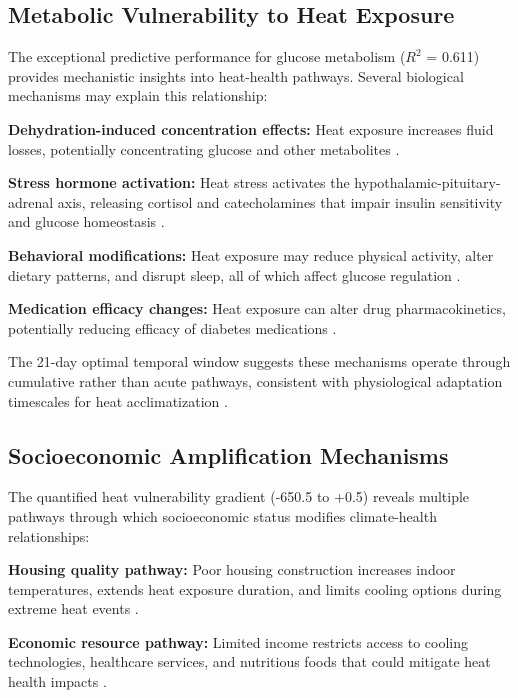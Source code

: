\documentclass[11pt,a4paper]{article}
\begin{document}
\subsection{Metabolic Vulnerability to Heat Exposure}

The exceptional predictive performance for glucose metabolism ($R^2$ = 0.611) provides mechanistic insights into heat-health pathways. Several biological mechanisms may explain this relationship:

\textbf{Dehydration-induced concentration effects:} Heat exposure increases fluid losses, potentially concentrating glucose and other metabolites \cite{cheuvront2014dehydration, armstrong2012dehydration}.

\textbf{Stress hormone activation:} Heat stress activates the hypothalamic-pituitary-adrenal axis, releasing cortisol and catecholamines that impair insulin sensitivity and glucose homeostasis \cite{kanikowska2015biorhythms, carrillo2015heart}.

\textbf{Behavioral modifications:} Heat exposure may reduce physical activity, alter dietary patterns, and disrupt sleep, all of which affect glucose regulation \cite{obradovich2017nighttime, park2018households}.

\textbf{Medication efficacy changes:} Heat exposure can alter drug pharmacokinetics, potentially reducing efficacy of diabetes medications \cite{westaway2015medicines}.

The 21-day optimal temporal window suggests these mechanisms operate through cumulative rather than acute pathways, consistent with physiological adaptation timescales for heat acclimatization \cite{tyler2016heat, periard2015adaptations}.

\subsection{Socioeconomic Amplification Mechanisms}

The quantified heat vulnerability gradient (-650.5 to +0.5) reveals multiple pathways through which socioeconomic status modifies climate-health relationships:

\textbf{Housing quality pathway:} Poor housing construction increases indoor temperatures, extends heat exposure duration, and limits cooling options during extreme heat events \cite{vardoulakis2014comparative, loughnan2010effects}.

\textbf{Economic resource pathway:} Limited income restricts access to cooling technologies, healthcare services, and nutritious foods that could mitigate heat health impacts \cite{hajek2019climate, malin2018developing}.
\end{document}
